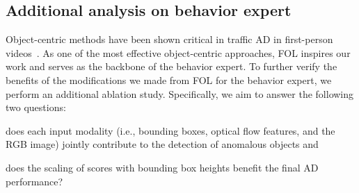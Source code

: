 \subsection{Additional analysis on behavior expert}
Object-centric methods have been shown critical in traffic AD in first-person videos~\citep{yao2019unsupervised,yao2022dota,fang2022traffic}. As one of the most effective object-centric approaches, FOL inspires our work and serves as the backbone of the behavior expert. To further verify the benefits of the modifications we made from FOL for the behavior expert, we perform an additional ablation study. Specifically, we aim to answer the following two questions:
\begin{enumerate*}[label=(\arabic*)]
\item
does each input modality (i.e., bounding boxes, optical flow features, and the RGB image) jointly contribute to the detection of anomalous objects and
\item
does the scaling of scores with bounding box heights benefit the final AD performance?
\end{enumerate*}

\begin{table}[t]
  \begin{center}
    \caption{Ablation study on the behavior expert.}
    \label{table:behavior-expert-ablations}
  \end{center}
\end{table}

